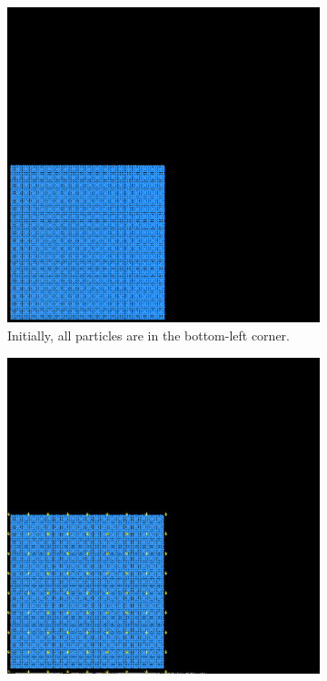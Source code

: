 \begin{figure}[h]
  \centering
  \begin{subfigure}[t]{0.2\textwidth}
      \includegraphics[width=\textwidth]{figures/pic_init.png}
      \caption{Initially, all particles are in the bottom-left corner.}
  \end{subfigure}
  \hspace{1em}
  \begin{subfigure}[t]{0.2\textwidth}
      \includegraphics[width=\textwidth]{figures/pic_apply_g.png}

\end{subfigure}
\end{figure}

